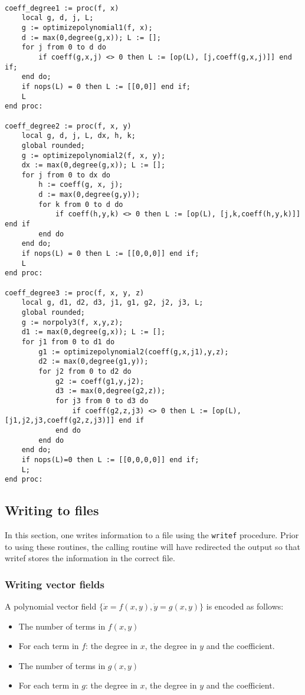 \documentclass[a4paper,10pt]{article}
\begin{document}
\begin{lstlisting}[name=writelog]

coeff_degree1 := proc(f, x)
    local g, d, j, L;
    g := optimizepolynomial1(f, x);
    d := max(0,degree(g,x)); L := [];
    for j from 0 to d do
        if coeff(g,x,j) <> 0 then L := [op(L), [j,coeff(g,x,j)]] end if;
    end do;
    if nops(L) = 0 then L := [[0,0]] end if;
    L
end proc:

coeff_degree2 := proc(f, x, y)
    local g, d, j, L, dx, h, k;
    global rounded;
    g := optimizepolynomial2(f, x, y);
    dx := max(0,degree(g,x)); L := [];
    for j from 0 to dx do
        h := coeff(g, x, j);
        d := max(0,degree(g,y));
        for k from 0 to d do
            if coeff(h,y,k) <> 0 then L := [op(L), [j,k,coeff(h,y,k)]] end if
        end do
    end do;
    if nops(L) = 0 then L := [[0,0,0]] end if;
    L
end proc:

coeff_degree3 := proc(f, x, y, z)
    local g, d1, d2, d3, j1, g1, g2, j2, j3, L;
    global rounded;
    g := norpoly3(f, x,y,z);
    d1 := max(0,degree(g,x)); L := [];
    for j1 from 0 to d1 do
        g1 := optimizepolynomial2(coeff(g,x,j1),y,z);
        d2 := max(0,degree(g1,y));
        for j2 from 0 to d2 do
            g2 := coeff(g1,y,j2);
            d3 := max(0,degree(g2,z));
            for j3 from 0 to d3 do
                if coeff(g2,z,j3) <> 0 then L := [op(L), [j1,j2,j3,coeff(g2,z,j3)]] end if
            end do
        end do
    end do;
    if nops(L)=0 then L := [[0,0,0,0]] end if;
    L;
end proc:
\end{lstlisting}

\subsection{Writing to files}

In this section, one writes information to a file using the \verb+writef+ procedure.  Prior
to using these routines, the calling routine will have redirected the output so that writef
stores the information in the correct file.

\subsubsection{Writing vector fields}

A polynomial vector field $\{\dot{x} = f(x,y), \dot{y} = g(x,y)\}$ is encoded as follows:
\begin{itemize}
\item
    The number of terms in $f(x,y)$
\item
    For each term in $f$: the degree in $x$, the degree in $y$ and the coefficient.
\item
    The number of terms in $g(x,y)$
\item
    For each term in $g$: the degree in $x$, the degree in $y$ and the coefficient.
\end{itemize}
\end{document}

